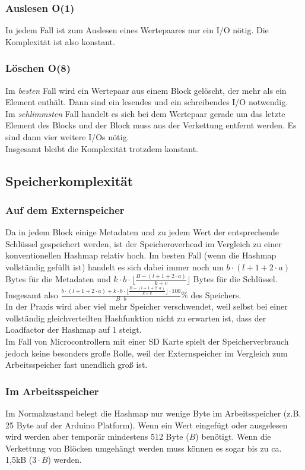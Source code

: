 \documentclass{article}
\begin{document}
\subsubsection{Auslesen O(1)}
In jedem Fall ist zum Auslesen eines Wertepaares nur ein I/O nötig. Die
Komplexität ist also konstant.

\subsubsection{Löschen O(8)}
Im \emph{besten} Fall wird ein Wertepaar aus einem Block gelöscht, der mehr als
ein Element enthält. Dann sind ein lesendes und ein schreibendes I/O notwendig.\\
Im \emph{schlimmsten} Fall handelt es sich bei dem Wertepaar gerade um das
letzte Element des Blocks und der Block muss aus der Verkettung entfernt werden. Es
sind dann vier weitere I/Os nötig.\\
Insgesamt bleibt die Komplexität trotzdem konstant.

\subsection{Speicherkomplexität}
\subsubsection{Auf dem Externspeicher}
Da in jedem Block einige Metadaten und zu jedem Wert der entsprechende Schlüssel
gespeichert werden, ist der Speicheroverhead im Vergleich zu einer
konventionellen Hashmap relativ hoch. Im besten Fall (wenn die Hashmap
vollständig gefüllt ist) handelt es sich dabei immer noch um $b\cdot (l +
1 + 2\cdot a)$ Bytes für die Metadaten und $k\cdot b \cdot
\big\lfloor\frac{B - (l + 1 + 2\cdot a)}{k + v}\big\rfloor$ Bytes für die
Schlüssel. Insgesamt also $\frac{b\cdot (l + 1 + 2\cdot a) + k\cdot b \cdot
\big\lfloor\frac{B - (l + 1 + 2\cdot a)}{k + v}\big\rfloor \cdot 100}{B\cdot
b}\%$ des Speichers.\\
In der Praxis wird aber viel mehr Speicher verschwendet, weil selbst bei einer
vollständig gleichverteilten Hashfunktion nicht zu erwarten ist, dass der
Loadfactor der Hashmap auf 1 steigt.\\
Im Fall von Microcontrollern mit einer SD Karte spielt der
Speicherverbrauch jedoch keine besonders große Rolle, weil der Externspeicher im
Vergleich zum Arbeitsspeicher fast unendlich groß ist.

\subsubsection{Im Arbeitsspeicher}
Im Normalzustand belegt die Hashmap nur wenige Byte im Arbeitsspeicher (z.B. 25
Byte auf der Arduino Platform). Wenn ein Wert eingefügt oder ausgelesen wird
werden aber temporär mindestens 512 Byte ($B$) benötigt. Wenn die Verkettung
von Blöcken umgehängt werden muss können es sogar bis zu ca. 1,5kB
($3\cdot B$) werden.
\end{document}
